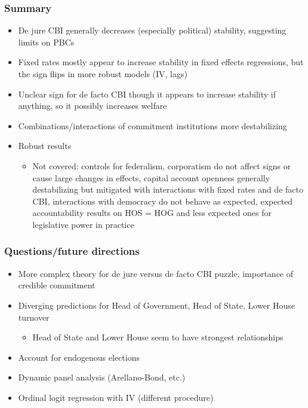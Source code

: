 \documentclass{beamer}
\begin{document}
    \begin{frame}
        \frametitle{Summary}
        \begin{itemize}
            \item De jure CBI generally decreases (especially political) stability, suggesting limits on PBCs
            \item Fixed rates mostly appear to increase stability in fixed effects regressions, but the sign flips in more robust models (IV, lags)
            \item Unclear sign for de facto CBI though it appears to increase stability if anything, so it possibly increases welfare
            \item Combinations/interactions of commitment institutions more destabilizing
            \item Robust results
            \begin{itemize}
                \item Not covered: controls for federalism, corporatism do not affect signs or cause large changes in effects, capital account openness generally destabilizing but mitigated with interactions with fixed rates and de facto CBI, interactions with democracy do not behave as expected, expected accountability results on HOS = HOG and less expected ones for legislative power in practice
            \end{itemize}
        \end{itemize}
    \end{frame}

    \begin{frame}
        \frametitle{Questions/future directions}
        \begin{itemize}
            \item More complex theory for de jure versus de facto CBI puzzle, importance of credible commitment
            \item Diverging predictions for Head of Government, Head of State, Lower House turnover
            \begin{itemize}
                \item Head of State and Lower House seem to have strongest relationships
            \end{itemize}
            \item Account for endogenous elections
            \item Dynamic panel analysis (Arellano-Bond, etc.)
            \item Ordinal logit regression with IV (different procedure)
        \end{itemize}
    \end{frame}
\end{document}
